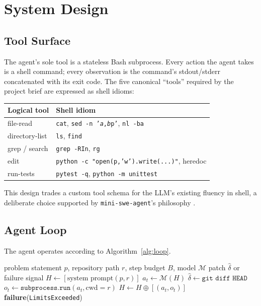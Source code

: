 \documentclass[11pt]{article}
\begin{document}
\section{System Design}
\label{sec:design}

\subsection{Tool Surface}
\label{sec:tools}

The agent's sole tool is a stateless Bash subprocess.  Every action the agent
takes is a shell command; every observation is the command's stdout/stderr
concatenated with its exit code.  The five canonical ``tools'' required by the
project brief are expressed as shell idioms:

\begin{center}
\begin{tabular}{ll}
\toprule
\textbf{Logical tool} & \textbf{Shell idiom} \\
\midrule
file-read       & \texttt{cat}, \texttt{sed -n '\textit{a},\textit{b}p'}, \texttt{nl -ba} \\
directory-list  & \texttt{ls}, \texttt{find} \\
grep / search   & \texttt{grep -RIn}, \texttt{rg} \\
edit            & \texttt{python -c "open(p,'w').write(...)"}, heredoc \\
run-tests       & \texttt{pytest -q}, \texttt{python -m unittest} \\
\bottomrule
\end{tabular}
\end{center}

This design trades a custom tool schema for the LLM's existing fluency in
shell, a deliberate choice supported by \texttt{mini-swe-agent}'s philosophy
\citep{yang2024sweagent}.

\subsection{Agent Loop}
\label{sec:loop}

The agent operates according to Algorithm~\ref{alg:loop}.

\begin{algorithm}[ht]
\caption{Minimal coding-agent tool loop}
\label{alg:loop}
\begin{algorithmic}[1]
\Require problem statement $p$, repository path $r$, step budget $B$, model $\mathcal{M}$
\Ensure patch $\hat{\delta}$ or failure signal
\State $H \gets [\text{system prompt}(p, r)]$  
  \State $a_t \gets \mathcal{M}(H)$  
    \State \Return $\hat{\delta} \gets \texttt{git diff HEAD}$
  \EndIf
  \State $o_t \gets \texttt{subprocess.run}(a_t, \text{cwd}=r)$  
  \State $H \gets H \oplus [(a_t, o_t)]$  
\EndFor
\State \Return \textbf{failure}(\texttt{LimitsExceeded})
\end{algorithmic}
\end{algorithm}
\end{document}
